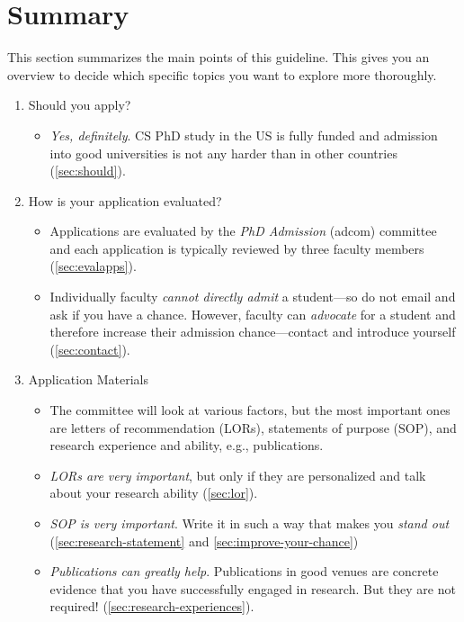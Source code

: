 \documentclass[oneside,11pt,dvipsnames]{book}
\begin{document}
\chapter{Summary}\label{sec:summary}

This section summarizes the main points of this guideline. This gives you an overview to decide which specific topics you want to explore more thoroughly.


\begin{enumerate}
  \item Should you apply?
        \begin{itemize}
          \item \emph{Yes, definitely}.  CS PhD study in the US is fully funded and admission into good universities is not any harder than in other countries (\autoref{sec:should}).
        \end{itemize}
  \item How is your application evaluated?
        \begin{itemize}
          \item Applications are evaluated by the \emph{PhD Admission} (adcom) committee and each application is typically reviewed by three faculty members (\autoref{sec:evalapps}).
          \item Individually faculty \emph{cannot directly admit} a student---so do not email and ask if you have a chance. However, faculty can \emph{advocate} for a student and therefore increase their admission chance---contact and introduce yourself (\autoref{sec:contact}).
         \end{itemize}
  \item Application Materials
        \begin{itemize}
          \item The committee will look at various factors, but the most important ones are letters of recommendation (LORs),  statements of purpose (SOP), and research experience and ability, e.g., publications.
          \item \emph{LORs are very important}, but only if they are personalized and talk about your research ability (\autoref{sec:lor}).
          \item \emph{SOP is very important}. Write it in such a way that makes you \emph{stand out} (\autoref{sec:research-statement} and \autoref{sec:improve-your-chance})
          \item  \emph{Publications can greatly help}. Publications in good venues are concrete evidence that you have successfully engaged in research. But they are not required! (\autoref{sec:research-experiences}).


\end{itemize}
\end{enumerate}
\end{document}
